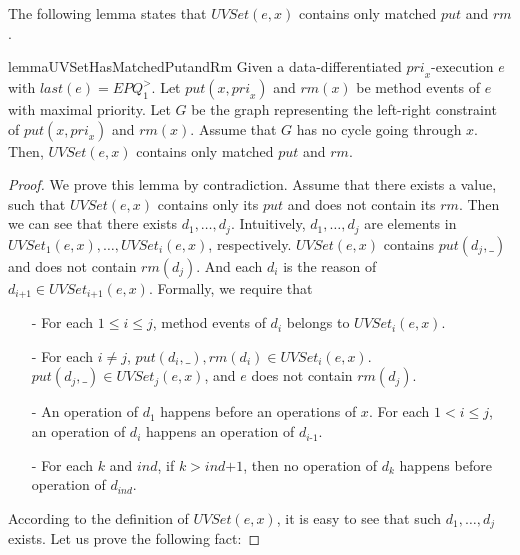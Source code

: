The following lemma states that $\textit{UVSet}(e,x)$ contains only matched $\textit{put}$ and $\textit{rm}$.

\begin{restatable}{lemma}{UVSetHasMatchedPutandRm}
\label{lemma:UVSet has matched put and rm}
Given a data-differentiated $\textit{pri}_x$-execution $e$ with $\textit{last}(e) = \textit{EPQ}_1^{>}$. Let $\textit{put}(x,\textit{pri}_x)$ and $\textit{rm}(x)$ be method events of $e$ with maximal priority. Let $G$ be the graph representing the left-right constraint of $\textit{put}(x,\textit{pri}_x)$ and $\textit{rm}(x)$. Assume that $G$ has no cycle going through $x$. Then, $\textit{UVSet}(e,x)$ contains only matched $\textit{put}$ and $\textit{rm}$.
\end{restatable}
\begin {proof}

We prove this lemma by contradiction. Assume that there exists a value, such that $\textit{UVSet}(e,x)$ contains only its $\textit{put}$ and does not contain its $\textit{rm}$. Then we can see that there exists $d_1,\ldots,d_j$. Intuitively, $d_1,\ldots,d_j$ are elements in $\textit{UVSet}_1(e,x), \ldots, \textit{UVSet}_i(e,x)$, respectively. $\textit{UVSet}(e,x)$ contains $\textit{put}(d_j,\_)$ and does not contain $\textit{rm}(d_j)$. And each $d_i$ is the reason of $d_{\textit{i+1}} \in \textit{UVSet}_{\textit{i+1}}(e,x)$. Formally, we require that

\begin{itemize}
\setlength{\itemsep}{0.5pt}
\item[-] For each $1 \leq i \leq j$, method events of $d_i$ belongs to $\textit{UVSet}_i(e,x)$.

\item[-] For each $i \neq j$, $\textit{put}(d_i,\_),\textit{rm}(d_i) \in \textit{UVSet}_i(e,x)$. $\textit{put}(d_j,\_) \in \textit{UVSet}_j(e,x)$, and $e$ does not contain $\textit{rm}(d_j)$.

\item[-] An operation of $d_1$ happens before an operations of $x$. For each $1 < i \leq j$, an operation of $d_i$ happens an operation of $d_{\textit{i-1}}$.

\item[-] For each $k$ and $\textit{ind}$, if $k > \textit{ind+1}$, then no operation of $d_k$ happens before operation of $d_{\textit{ind}}$.
\end{itemize}

According to the definition of $\textit{UVSet}(e,x)$, it is easy to see that such $d_1,\ldots,d_j$ exists. Let us prove the following fact:


\end{proof}
